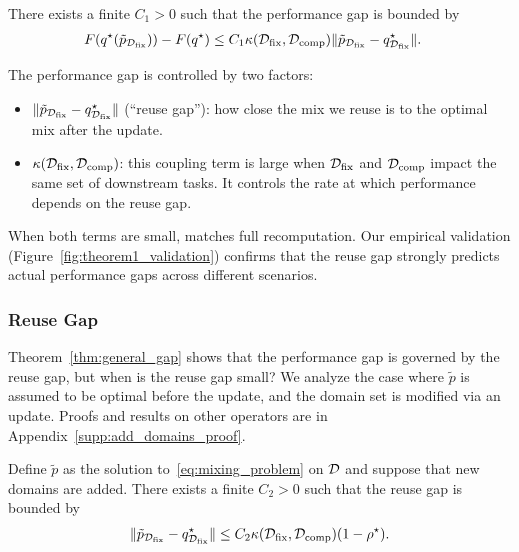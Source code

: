 \begin{theorem} \label{thm:general_gap} There exists a finite $C_1 > 0$ such that the performance gap is bounded by
\begin{align*} 
&F(q^\star(\tilde{p}_{\mathcal{D}_{\text{fix}}})) - F(q^\star) \le C_1 \kappa(\mathcal{D}_{\text{fix}}, \mathcal{D}_{\text{comp}}) \|\tilde{p}_{\mathcal{D}_{\text{fix}}} - q^\star_{\mathcal{D}_{\text{fix}}}\|.
\end{align*} 
\end{theorem}


The performance gap is controlled by two factors: \begin{itemize}[itemsep=0pt,topsep=2pt,leftmargin=12pt] 
\item $\|\tilde{p}_{\mathcal{D}_{\text{fix}}} - q^\star_{\mathcal{D}_{\text{fix}}} \|$ (``reuse gap''): how close the mix we reuse is to the optimal mix after the update. 
\item $\kappa(\mathcal{D}_{\text{fix}}, \mathcal{D}_{\text{comp}})$: this coupling term is large when $\mathcal{D}_{\text{fix}}$ and $\mathcal{D}_{\text{comp}}$ impact the same set of downstream tasks. It controls the rate at which performance depends on the reuse gap. 
\end{itemize}


When both terms are small, \fullmixreuse matches full recomputation. Our empirical validation (Figure~\ref{fig:theorem1_validation}) confirms that the reuse gap strongly predicts actual performance gaps across different scenarios.


\subsubsection{Reuse Gap}

Theorem~\ref{thm:general_gap} shows that the performance gap is governed by the reuse gap, but when is the reuse gap small? 
We analyze the case where $\tilde{p}$ is assumed to be optimal before the update, and the domain set is modified via an \Add update.
Proofs and results on other operators are in Appendix~\ref{supp:add_domains_proof}.



\begin{theorem}\label{thm:add_domains}
Define $\tilde{p}$ as the solution to~\eqref{eq:mixing_problem} on $\mathcal{D}$ and suppose that new domains are added. There exists a finite $C_2 > 0$ such that the reuse gap is bounded by
    \begin{align*}
        \|\tilde{p}_{\mathcal{D}_{\text{fix}}} - q^\star_{\mathcal{D}_{\text{fix}}}\| \le C_2 \kappa(\mathcal{D}_{\text{fix}}, \mathcal{D}_{\text{comp}}) (1 - \rho^\star).
    \end{align*}
\end{theorem}

